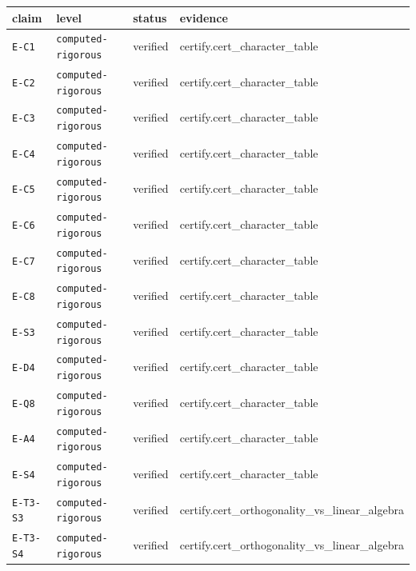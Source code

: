 \begin{longtable}{p{1.6cm}p{3.0cm}p{1.3cm}p{6.8cm}}
\toprule
claim & level & status & evidence \\
\midrule
\endhead
\texttt{E-C1} & {\footnotesize\texttt{computed-rigorous}} & verified & \footnotesize certify.cert\_character\_table \\
\texttt{E-C2} & {\footnotesize\texttt{computed-rigorous}} & verified & \footnotesize certify.cert\_character\_table \\
\texttt{E-C3} & {\footnotesize\texttt{computed-rigorous}} & verified & \footnotesize certify.cert\_character\_table \\
\texttt{E-C4} & {\footnotesize\texttt{computed-rigorous}} & verified & \footnotesize certify.cert\_character\_table \\
\texttt{E-C5} & {\footnotesize\texttt{computed-rigorous}} & verified & \footnotesize certify.cert\_character\_table \\
\texttt{E-C6} & {\footnotesize\texttt{computed-rigorous}} & verified & \footnotesize certify.cert\_character\_table \\
\texttt{E-C7} & {\footnotesize\texttt{computed-rigorous}} & verified & \footnotesize certify.cert\_character\_table \\
\texttt{E-C8} & {\footnotesize\texttt{computed-rigorous}} & verified & \footnotesize certify.cert\_character\_table \\
\texttt{E-S3} & {\footnotesize\texttt{computed-rigorous}} & verified & \footnotesize certify.cert\_character\_table \\
\texttt{E-D4} & {\footnotesize\texttt{computed-rigorous}} & verified & \footnotesize certify.cert\_character\_table \\
\texttt{E-Q8} & {\footnotesize\texttt{computed-rigorous}} & verified & \footnotesize certify.cert\_character\_table \\
\texttt{E-A4} & {\footnotesize\texttt{computed-rigorous}} & verified & \footnotesize certify.cert\_character\_table \\
\texttt{E-S4} & {\footnotesize\texttt{computed-rigorous}} & verified & \footnotesize certify.cert\_character\_table \\
\texttt{E-T3-S3} & {\footnotesize\texttt{computed-rigorous}} & verified & \footnotesize certify.cert\_orthogonality\_vs\_linear\_algebra \\
\texttt{E-T3-S4} & {\footnotesize\texttt{computed-rigorous}} & verified & \footnotesize certify.cert\_orthogonality\_vs\_linear\_algebra \\

\end{longtable}
